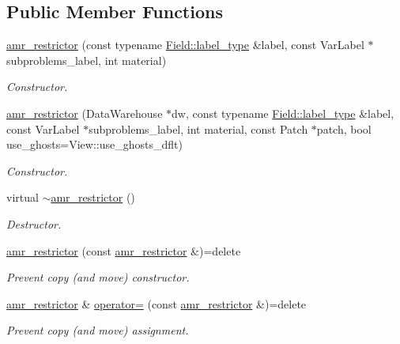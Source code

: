 \subsection*{Public Member Functions}
\begin{DoxyCompactItemize}
\item 
\hyperlink{classUintah_1_1PhaseField_1_1detail_1_1amr__restrictor_3_01VectorField_3_01T_00_01N_01_4_00_01Pre7f2e99a4fbf25ff00717d25c8580b1a_abdd0eb090306c15eaeeee55105877b1f}{amr\+\_\+restrictor} (const typename \hyperlink{structUintah_1_1PhaseField_1_1VectorField_a59698346336d8cdfdf767367839f2be9}{Field\+::label\+\_\+type} \&label, const Var\+Label $\ast$subproblems\+\_\+label, int material)
\begin{DoxyCompactList}\small\item\em Constructor. \end{DoxyCompactList}\item 
\hyperlink{classUintah_1_1PhaseField_1_1detail_1_1amr__restrictor_3_01VectorField_3_01T_00_01N_01_4_00_01Pre7f2e99a4fbf25ff00717d25c8580b1a_a7c6b000db52c00663a106bbcfd22e287}{amr\+\_\+restrictor} (Data\+Warehouse $\ast$dw, const typename \hyperlink{structUintah_1_1PhaseField_1_1VectorField_a59698346336d8cdfdf767367839f2be9}{Field\+::label\+\_\+type} \&label, const Var\+Label $\ast$subproblems\+\_\+label, int material, const Patch $\ast$patch, bool use\+\_\+ghosts=View\+::use\+\_\+ghosts\+\_\+dflt)
\begin{DoxyCompactList}\small\item\em Constructor. \end{DoxyCompactList}\item 
virtual \hyperlink{classUintah_1_1PhaseField_1_1detail_1_1amr__restrictor_3_01VectorField_3_01T_00_01N_01_4_00_01Pre7f2e99a4fbf25ff00717d25c8580b1a_a0f0accb3ad8bfab4b88464b61f3b3491}{$\sim$amr\+\_\+restrictor} ()
\begin{DoxyCompactList}\small\item\em Destructor. \end{DoxyCompactList}\item 
\hyperlink{classUintah_1_1PhaseField_1_1detail_1_1amr__restrictor_3_01VectorField_3_01T_00_01N_01_4_00_01Pre7f2e99a4fbf25ff00717d25c8580b1a_a58c616d121749519316e5241271e618a}{amr\+\_\+restrictor} (const \hyperlink{classUintah_1_1PhaseField_1_1detail_1_1amr__restrictor}{amr\+\_\+restrictor} \&)=delete
\begin{DoxyCompactList}\small\item\em Prevent copy (and move) constructor. \end{DoxyCompactList}\item 
\hyperlink{classUintah_1_1PhaseField_1_1detail_1_1amr__restrictor}{amr\+\_\+restrictor} \& \hyperlink{classUintah_1_1PhaseField_1_1detail_1_1amr__restrictor_3_01VectorField_3_01T_00_01N_01_4_00_01Pre7f2e99a4fbf25ff00717d25c8580b1a_a8a66e1c425c67a41925ea9714816d586}{operator=} (const \hyperlink{classUintah_1_1PhaseField_1_1detail_1_1amr__restrictor}{amr\+\_\+restrictor} \&)=delete
\begin{DoxyCompactList}\small\item\em Prevent copy (and move) assignment. \end{DoxyCompactList}\end{DoxyCompactItemize}

